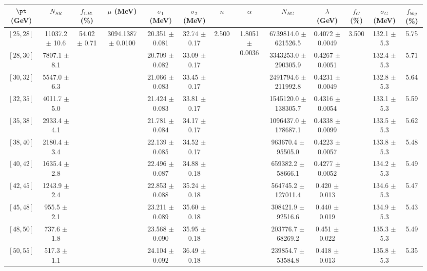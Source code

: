 \begin{tabular}{c||c|c|c|c|c|c|c|c|c|c|c||c}
$\pt$ (GeV) & $N_{SR}$ & $f_{CB1}$ (\%) & $\mu$ (MeV) & $\sigma_1$ (MeV) & $\sigma_2$ (MeV) & $n$ & $\alpha$ & $N_{BG}$ & $\lambda$ (GeV) & $f_G$ (\%) & $\sigma_G$ (MeV) & $f_{bkg}$ (\%) \\
\hline
$[25, 28]$ & 11037.2 $\pm$ 10.6 & \multirow{19}{*}{54.02 $\pm$ 0.71} & \multirow{19}{*}{3094.1387 $\pm$ 0.0100} & 20.351 $\pm$ 0.081 & 32.74 $\pm$ 0.17 & \multirow{19}{*}{2.500} & \multirow{19}{*}{1.8051 $\pm$ 0.0036} & 6739814.0 $\pm$ 621526.5 & 0.4072 $\pm$ 0.0049 & \multirow{19}{*}{3.500} & 132.1 $\pm$ 5.3 & 5.75\\
$[28, 30]$ & 7807.1 $\pm$ 8.1 &  &  & 20.709 $\pm$ 0.082 & 33.09 $\pm$ 0.17 &  &  & 3343253.0 $\pm$ 290305.9 & 0.4267 $\pm$ 0.0051 &  & 132.4 $\pm$ 5.3 & 5.71\\
$[30, 32]$ & 5547.0 $\pm$ 6.3 &  &  & 21.066 $\pm$ 0.083 & 33.45 $\pm$ 0.17 &  &  & 2491794.6 $\pm$ 211992.8 & 0.4231 $\pm$ 0.0049 &  & 132.8 $\pm$ 5.3 & 5.64\\
$[32, 35]$ & 4011.7 $\pm$ 5.0 &  &  & 21.424 $\pm$ 0.083 & 33.81 $\pm$ 0.17 &  &  & 1545120.0 $\pm$ 138305.7 & 0.4316 $\pm$ 0.0054 &  & 133.1 $\pm$ 5.3 & 5.59\\
$[35, 38]$ & 2933.4 $\pm$ 4.1 &  &  & 21.781 $\pm$ 0.084 & 34.17 $\pm$ 0.17 &  &  & 1096437.0 $\pm$ 178687.1 & 0.4338 $\pm$ 0.0099 &  & 133.5 $\pm$ 5.3 & 5.62\\
$[38, 40]$ & 2180.4 $\pm$ 3.4 &  &  & 22.139 $\pm$ 0.085 & 34.52 $\pm$ 0.17 &  &  & 963670.4 $\pm$ 95505.0 & 0.4223 $\pm$ 0.0057 &  & 133.8 $\pm$ 5.3 & 5.48\\
$[40, 42]$ & 1635.4 $\pm$ 2.8 &  &  & 22.496 $\pm$ 0.087 & 34.88 $\pm$ 0.18 &  &  & 659382.2 $\pm$ 58666.1 & 0.4277 $\pm$ 0.0052 &  & 134.2 $\pm$ 5.3 & 5.49\\
$[42, 45]$ & 1243.9 $\pm$ 2.4 &  &  & 22.853 $\pm$ 0.088 & 35.24 $\pm$ 0.18 &  &  & 564745.2 $\pm$ 127011.4 & 0.420 $\pm$ 0.013 &  & 134.6 $\pm$ 5.3 & 5.47\\
$[45, 48]$ & 955.5 $\pm$ 2.1 &  &  & 23.211 $\pm$ 0.089 & 35.60 $\pm$ 0.18 &  &  & 308421.9 $\pm$ 92516.6 & 0.440 $\pm$ 0.019 &  & 134.9 $\pm$ 5.3 & 5.43\\
$[48, 50]$ & 737.6 $\pm$ 1.8 &  &  & 23.568 $\pm$ 0.090 & 35.95 $\pm$ 0.18 &  &  & 203776.7 $\pm$ 68269.2 & 0.451 $\pm$ 0.022 &  & 135.3 $\pm$ 5.3 & 5.49\\
$[50, 55]$ & 517.3 $\pm$ 1.1 &  &  & 24.104 $\pm$ 0.092 & 36.49 $\pm$ 0.18 &  &  & 239854.7 $\pm$ 53584.8 & 0.418 $\pm$ 0.013 &  & 135.8 $\pm$ 5.3 & 5.35\\

\end{tabular}
